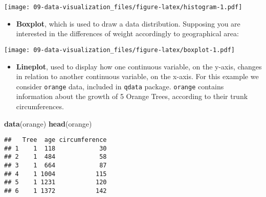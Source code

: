 \documentclass[]{book}
\newenvironment{Shaded}{\begin{snugshade}}{\end{snugshade}}
\newcommand{\KeywordTok}[1]{\textcolor[rgb]{0.13,0.29,0.53}{\textbf{{#1}}}}
\newcommand{\DataTypeTok}[1]{\textcolor[rgb]{0.13,0.29,0.53}{{#1}}}
\newcommand{\StringTok}[1]{\textcolor[rgb]{0.31,0.60,0.02}{{#1}}}
\newcommand{\CommentTok}[1]{\textcolor[rgb]{0.56,0.35,0.01}{\textit{{#1}}}}
\newcommand{\NormalTok}[1]{{#1}}
\providecommand{\tightlist}{%
  \setlength{\itemsep}{0pt}\setlength{\parskip}{0pt}}
\def\tightlist{}
\begin{document}
\texttt{[image: 09-data-visualization\_files/figure-latex/histogram-1.pdf]}

\clearpage

\begin{itemize}
\tightlist
\item
  \textbf{Boxplot}, which is used to draw a data distribution. Supposing
  you are interested in the differences of weight accordingly to
  geographical area:
\end{itemize}

\begin{Shaded}
\end{Shaded}

\texttt{[image: 09-data-visualization\_files/figure-latex/boxplot-1.pdf]}

\begin{itemize}
\tightlist
\item
  \textbf{Lineplot}, used to display how one continuous variable, on the
  y-axis, changes in relation to another continuous variable, on the
  x-axis. For this example we consider \texttt{orange} data, included in
  \texttt{qdata} package. \texttt{orange} contains information about the
  growth of 5 Orange Trees, according to their trunk circumferences.
\end{itemize}

\begin{Shaded}
\begin{Highlighting}[]
\KeywordTok{data}\NormalTok{(orange)}
\KeywordTok{head}\NormalTok{(orange)}
\end{Highlighting}
\end{Shaded}

\begin{verbatim}
##   Tree  age circumference
## 1    1  118            30
## 2    1  484            58
## 3    1  664            87
## 4    1 1004           115
## 5    1 1231           120
## 6    1 1372           142
\end{verbatim}
\end{document}
